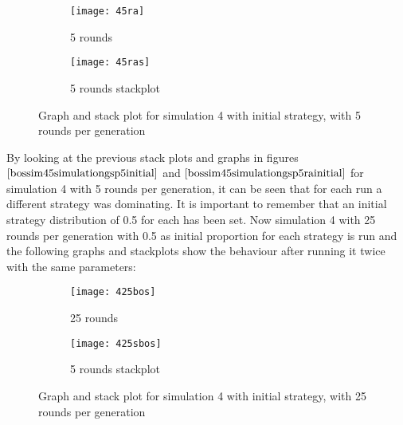 \begin{figure}[H]       
    \centering
    \begin{subfigure}[b]{0.3\textwidth}
	\centering
	{\texttt{[image: 45ra]}}   
    	\caption{5 rounds}
	\label{fig:bossim45ra}
    \end{subfigure}
    \hfill
    \begin{subfigure}[b]{0.3\textwidth}
	\centering
	{\texttt{[image: 45ras]}}   
    	\caption{5 rounds stackplot}
	\label{fig:bossim45ras}
    \end{subfigure}
    \caption{Graph and stack plot for simulation 4 with initial strategy, with 5 rounds per generation}
    \label{bossim45simulationgsp5rainitial}
\end{figure}

By looking at the previous stack plots and graphs in figures $\ref{bossim45simulationgsp5initial}$ and $\ref{bossim45simulationgsp5rainitial}$ for simulation 4 with 5 rounds per generation, it can be seen that for each run a different strategy was dominating. It is important to remember that an initial strategy distribution of 0.5 for each has been set.
Now simulation 4 with 25 rounds per generation with 0.5 as initial proportion for each strategy is run and the following graphs and stackplots show the behaviour after running it twice with the same parameters:

\begin{figure}[H]       
    \centering
    \begin{subfigure}[b]{0.3\textwidth}
	\centering
	{\texttt{[image: 425bos]}}   
    	\caption{25 rounds}
	\label{fig:bossim425bos}
    \end{subfigure}
    \hfill
    \begin{subfigure}[b]{0.3\textwidth}
	\centering
	{\texttt{[image: 425sbos]}}   
    	\caption{5 rounds stackplot}
	\label{fig:bossim425sbos}
    \end{subfigure}
    \caption{Graph and stack plot for simulation 4 with initial strategy, with 25 rounds per generation}
    \label{bossim425simulationgsp5initial}
\end{figure}

